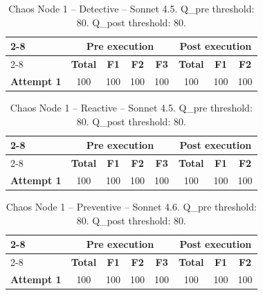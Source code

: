 \begin{table}[h]
\centering
\begin{tabular}{l|cccc|ccc|}
\cline{2-8}
& \multicolumn{4}{c|}{\textbf{Pre execution}} & \multicolumn{3}{c|}{\textbf{Post execution}} \\
\cline{2-8}
& \textbf{Total} & \textbf{F1} & \textbf{F2} & \textbf{F3} & \textbf{Total} & \textbf{F1} & \textbf{F2} \\
\hline
\textbf{Attempt 1} & 100 & 100 & 100 & 100 & 100 & 100 & 100 \\
\hline
\end{tabular}
\caption{Chaos Node 1 -- Detective -- Sonnet 4.5. Q\_pre threshold: 80. Q\_post threshold: 80.}
\label{tab:cn1_detective_sonnet45}
\end{table}

\begin{table}[h]
\centering
\begin{tabular}{l|cccc|ccc|}
\cline{2-8}
& \multicolumn{4}{c|}{\textbf{Pre execution}} & \multicolumn{3}{c|}{\textbf{Post execution}} \\
\cline{2-8}
& \textbf{Total} & \textbf{F1} & \textbf{F2} & \textbf{F3} & \textbf{Total} & \textbf{F1} & \textbf{F2} \\
\hline
\textbf{Attempt 1} & 100 & 100 & 100 & 100 & 100 & 100 & 100 \\
\hline
\end{tabular}
\caption{Chaos Node 1 -- Reactive -- Sonnet 4.5. Q\_pre threshold: 80. Q\_post threshold: 80.}
\label{tab:cn1_reactive_sonnet45}
\end{table}

\clearpage

\begin{table}[h]
\centering
\begin{tabular}{l|cccc|ccc|}
\cline{2-8}
& \multicolumn{4}{c|}{\textbf{Pre execution}} & \multicolumn{3}{c|}{\textbf{Post execution}} \\
\cline{2-8}
& \textbf{Total} & \textbf{F1} & \textbf{F2} & \textbf{F3} & \textbf{Total} & \textbf{F1} & \textbf{F2} \\
\hline
\textbf{Attempt 1} & 100 & 100 & 100 & 100 & 100 & 100 & 100 \\
\hline
\end{tabular}
\caption{Chaos Node 1 -- Preventive -- Sonnet 4.6. Q\_pre threshold: 80. Q\_post threshold: 80.}
\label{tab:cn1_preventive_sonnet46}
\end{table}

